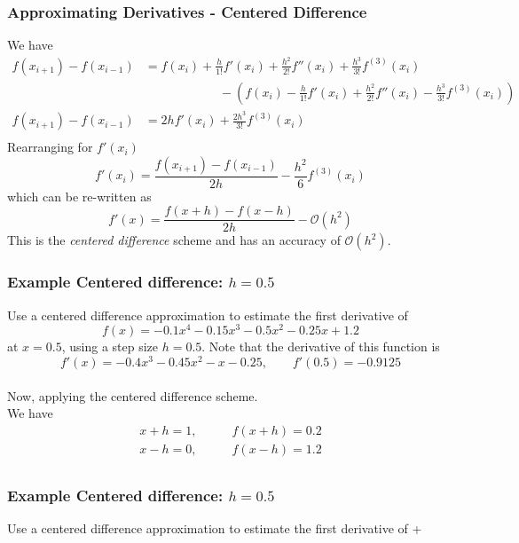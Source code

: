 \documentclass{if-beamer}
\begin{document}
\begin{frame}
\frametitle{Approximating Derivatives - Centered Difference}
We have
\begin{align*}
f(x_{i+1}) - f(x_{i-1}) &= f(x_i) +\frac{h}{1!}f'(x_i) + \frac{h^2}{2!}f''(x_i) + \frac{h^3}{3!}f^{(3)}(x_i)\\
&  \qquad \qquad \qquad-\left(f(x_i) -\frac{h}{1!}f'(x_i) + \frac{h^2}{2!}f''(x_i)-\frac{h^3}{3!}f^{(3)}(x_i)\right)\\
f(x_{i+1}) - f(x_{i-1}) &= 2hf'(x_i)+\frac{2h^3}{3!}f^{(3)}(x_i)\\
\end{align*}
Rearranging for $f'(x_i)$
$$f'(x_i) = \frac{f(x_{i+1})-f(x_{i-1})}{2h} -\frac{h^2}{6}f^{(3)}(x_i)$$
which can be re-written as
$$f'(x) = \frac{f(x+h)-f(x-h)}{2h} -\mathcal{O}(h^2)$$
This is the \textit{centered difference} scheme and has an accuracy of $\mathcal{O}(h^2)$.
\end{frame}
\begin{frame}
\frametitle{Example Centered difference: $h= 0.5$}
Use a centered difference approximation to estimate the first derivative of
$$f(x) = -0.1x^4-0.15x^3-0.5x^2-0.25x+1.2 $$
at $x=0.5$, using a step size $h = 0.5$. Note that the derivative of this function is
$$f'(x) = -0.4x^3-0.45x^2-x-0.25, \qquad f'(0.5) = -0.9125$$
\\\vspace{5pt}
Now, applying the centered difference scheme.\\\vspace{5pt}
We have
\begin{align*}
x+h = 1, \qquad &f(x+h) = 0.2\\
x-h = 0, \qquad &f(x-h) = 1.2\\
\end{align*}
\end{frame}

\begin{frame}
\frametitle{Example Centered difference: $h= 0.5$}
Use a centered difference approximation to estimate the first derivative of
+\end{frame}
\end{document}
